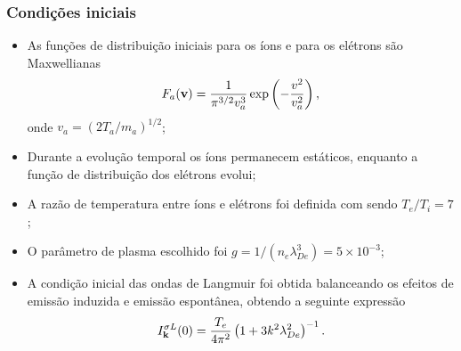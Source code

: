 \documentclass[10pt,aspectratio=1610,lualatex]{beamer}
\begin{document}
\begin{frame}
  \frametitle{Condições iniciais}
  \begin{itemize}
    \item As funções de distribuição iniciais para os íons e para os
    elétrons são Maxwellianas
    \begin{displaymath}
      F_a({\bf v})=\frac{1}{\pi^{3/2}v_a^3}
      \exp \left(-\frac{v^2}{v_a^2}\right),
    \end{displaymath}
    onde $v_a=(2T_a/m_a)^{1/2}$;
    \vspace{0.1cm}
    \pause
    \item Durante a evolução temporal os íons permanecem estáticos,
    enquanto a função de distribuição dos elétrons evolui;
    \vspace{0.1cm}
    \pause
    \item A razão de temperatura entre íons e elétrons foi
    definida com sendo $T_e/T_i=7$;
    \vspace{0.1cm}
    \pause
    \item O parâmetro de plasma escolhido foi
    $g=1/(n_e\lambda_{De}^3)=5\times 10^{-3}$;
    \vspace{0.1cm}
    \pause
    \item A condição inicial das ondas de Langmuir foi
    obtida balanceando os efeitos de emissão induzida e
    emissão espontânea, obtendo a seguinte expressão
    \begin{displaymath}
      I_{\bf k}^{\sigma L}(0)=\frac{T_e}{4\pi^2}
      \left( 1+3k^2\lambda_{De}^2\right)^{-1}.
    \end{displaymath}
  \end{itemize}
\end{frame}

\end{document}
